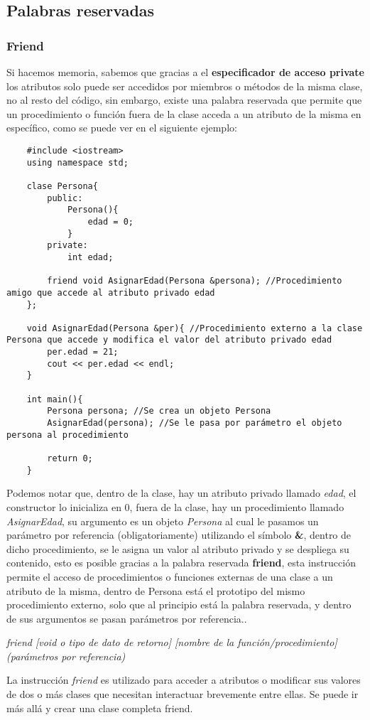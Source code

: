 \subsection{Palabras reservadas}
\subsubsection{Friend}
Si hacemos memoria, sabemos que gracias a el \textbf{especificador de acceso private} los atributos solo puede ser accedidos por miembros o métodos de la misma clase, no al resto del código, sin embargo, existe una palabra reservada que permite que un procedimiento o función fuera de la clase acceda a un atributo de la misma en específico, como se puede ver en el siguiente ejemplo:
\begin{lstlisting}
    #include <iostream>
    using namespace std;

    clase Persona{
        public:
            Persona(){
                edad = 0;
            }
        private:
            int edad;
        
        friend void AsignarEdad(Persona &persona); //Procedimiento amigo que accede al atributo privado edad
    };
    
    void AsignarEdad(Persona &per){ //Procedimiento externo a la clase Persona que accede y modifica el valor del atributo privado edad
        per.edad = 21;
        cout << per.edad << endl;
    }
    
    int main(){
        Persona persona; //Se crea un objeto Persona
        AsignarEdad(persona); //Se le pasa por parámetro el objeto persona al procedimiento
        
        return 0;
    }
\end{lstlisting}
Podemos notar que, dentro de la clase, hay un atributo privado llamado \textit{edad}, el constructor lo inicializa en 0, fuera de la clase, hay un procedimiento llamado \textit{AsignarEdad}, su argumento es un objeto \textit{Persona} al cual le pasamos un parámetro por referencia (obligatoriamente) utilizando el símbolo \textbf{\&}, dentro de dicho procedimiento, se le asigna un valor al atributo privado y se despliega su contenido, esto es posible gracias a la palabra reservada \textbf{friend}, esta instrucción permite el acceso de procedimientos o funciones externas de una clase a un atributo de la misma, dentro de Persona está el prototipo del mismo procedimiento externo, solo que al principio está la palabra reservada, y dentro de sus argumentos se pasan parámetros por referencia..\begin{center}\textit{friend [void o tipo de dato de retorno] [nombre de la función/procedimiento] (parámetros por referencia)}\end{center}
La instrucción \textit{friend} es utilizado para acceder a atributos o modificar sus valores de dos o más clases que necesitan interactuar brevemente entre ellas. Se puede ir más allá y crear una clase completa friend.
